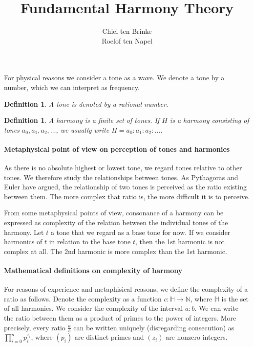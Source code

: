\documentclass[a4paper]{report}
\author{Chiel ten Brinke \\ Roelof ten Napel}
\title{Fundamental Harmony Theory}
\newtheorem{dfn}[thm]{Definition}
\newcommand{\cln}{\mathbin{:}}
\begin{document}
\maketitle

For physical reasons we consider a tone as a wave.
We denote a tone by a number, which we can interpret as frequency.

\begin{dfn}
	A tone is denoted by a rational number.
\end{dfn}

\begin{dfn}
	A harmony is a finite set of tones.
	If $H$ is a harmony consisting of tones $a_0,a_1,a_2,\dots$, we usually write $H = a_0 \cln a_1 \cln a_2 \cln \dots$.
\end{dfn}

\paragraph{Metaphysical point of view on perception of tones and harmonies}

As there is no absolute highest or lowest tone, we regard tones relative to other tones.
We therefore study the relationships between tones.
As Pythagoras and Euler have argued, the relationship of two tones is perceived as the ratio existing between them.
The more complex that ratio is, the more difficult it is to perceive.

From some metaphysical points of view, consonance of a harmony can be expressed as complexity of the relation between the individual tones of the harmony.
Let $t$ a tone that we regard as a base tone for now.
If we consider harmonics of $t$ in relation to the base tone $t$, then the 1st harmonic is not complex at all.
The 2nd harmonic is more complex than the 1st harmonic.


\paragraph{Mathematical definitions on complexity of harmony}
For reasons of experience and metaphisical reasons, we define the complexity of a ratio as follows.
Denote the complexity as a function $c:\mathbb{H} \to \mathbb{N}$, where $\mathbb{H}$ is the set of all harmonies.
We consider the complexity of the interval $a \cln b$.
We can write the ratio between them as a product of primes to the power of integers.
More precisely, every ratio $\frac{a}{b}$ can be written uniquely (disregarding consecution) as $\prod_{i=0}^{n} p_i^{z_i}$, where $(p_i)$ are distinct primes and $(z_i)$ are nonzero integers.
\end{document}
